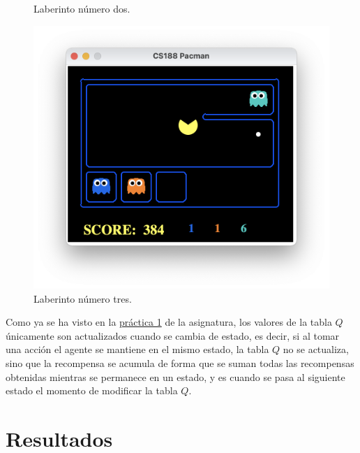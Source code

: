 \documentclass[11pt]{exam}
\begin{document}
\begin{figure}[H]
\begin{minipage}[c]{0.35\linewidth}
		\vspace*{-7mm}
		\caption{Laberinto número dos.}
		\label{lab2}
	\end{minipage}
\end{figure}

\vspace*{-7mm}

\begin{figure}[H]
	\centering
	\includegraphics[scale=0.4]{lab3}
	\vspace*{-7mm}
	\caption{Laberinto número tres.}
	\label{lab3}
\end{figure}

Como ya se ha visto en la \href{https://poliformat.upv.es/portal/site/ESP_0_2835/tool/c07b745a-0cfd-44f0-a7a2-9bb22f80c3f7?panel=Main}{práctica 1} de la asignatura, los valores de la tabla $Q$ únicamente son actualizados cuando se cambia de estado, es decir, si al tomar una acción el agente se mantiene en el mismo estado, la tabla $Q$ no se actualiza, sino que la recompensa se acumula de forma que se suman todas las recompensas obtenidas mientras se permanece en un estado, y es cuando se pasa al siguiente estado el momento de modificar la tabla $Q$. 
\vspace*{3mm}

\section{Resultados}\label{resultados}
\end{document}
